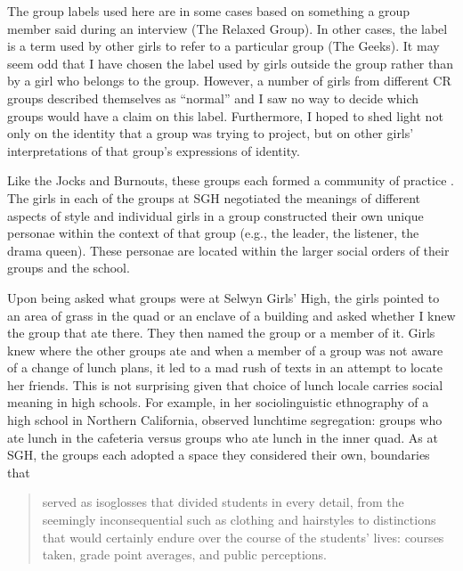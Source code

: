 The group labels used here are in some cases based on something a group member said during an interview (The Relaxed Group). In other cases, the label is a term used by other girls to refer to a particular group (The Geeks). It may seem odd that I have chosen the label used by girls outside the group rather than by a girl who belongs to the group. However, a number of girls from different CR groups described themselves as ``normal'' and I saw no way to decide which groups would have a claim on this label. Furthermore, I hoped to shed light not only on the identity that a group was trying to project, but on other girls' interpretations of that group's expressions of identity. 



Like the Jocks and Burnouts, these groups each formed a community of practice \citep{eckert2005}. The girls in each of the groups at SGH negotiated the meanings of different aspects of style and individual girls in a group constructed their own unique personae within the context of that group (e.g., the leader, the listener, the drama queen). These personae are located within the larger social orders of their groups and the school.

Upon being asked what groups were at Selwyn Girls' High, the girls pointed to an area of grass in the quad or an enclave of a building and asked whether I knew the group that ate there. They then named the group or a member of it. Girls knew where the other groups ate and when a member of a group was not aware of a change of lunch plans, it led to a mad rush of texts in an attempt to locate her friends. This is not surprising given that choice of lunch locale carries social meaning in high schools. For example, in her sociolinguistic ethnography of a high school in Northern California, \citet{mendozadenton2008} observed lunchtime segregation: groups who ate lunch in the cafeteria versus groups who ate lunch in the inner quad. As at SGH, the groups each adopted a space they considered their own, boundaries that

\begin{quote}
	served as isoglosses that divided students in every detail, from the seemingly inconsequential such as clothing and hairstyles to distinctions that would certainly endure over the course of the students' lives: courses taken, grade point averages, and public perceptions. \citep[27]{mendozadenton2008}
\end{quote}
  
